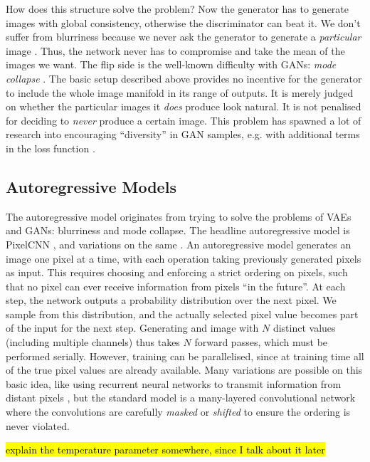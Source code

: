 \documentclass[10pt,a4paper]{article}
\newcommand{\nquote}[1]{``{#1}''}
\begin{document}
How does this structure solve the problem? Now the generator has to generate images with global consistency, otherwise the discriminator can beat it. We don't suffer from blurriness because we never ask the generator to generate a \emph{particular} image \cite{??}. Thus, the network never has to compromise and take the mean of the images we want. The flip side is the well-known difficulty with GANs: \emph{mode collapse} \cite{??}. The basic setup described above provides no incentive for the generator to include the whole image manifold in its range of outputs. It is merely judged on whether the particular images it \emph{does} produce look natural. It is not penalised for deciding to \emph{never} produce a certain image. This problem has spawned a lot of research into encouraging \nquote{diversity} in GAN samples, e.g. with additional terms in the loss function \cite{??}\cite{??}\cite{??}.

\subsection{Autoregressive Models}

The autoregressive model originates from trying to solve the problems of VAEs and GANs: blurriness and mode collapse. The headline autoregressive model is PixelCNN \cite{??}, and variations on the same \cite{??} \cite{??} \cite{??}. An autoregressive model generates an image one pixel at a time, with each operation taking previously generated pixels as input. This requires choosing and enforcing a strict ordering on pixels, such that no pixel can ever receive information from pixels \nquote{in the future}. At each step, the network outputs a probability distribution over the next pixel. We sample from this distribution, and the actually selected pixel value becomes part of the input for the next step. Generating and image with $N$ distinct values (including multiple channels) thus takes $N$ forward passes, which must be performed serially. However, training can be parallelised, since at training time all of the true pixel values are already available. Many variations are possible on this basic idea, like using recurrent neural networks to transmit information from distant pixels \cite{??}, but the standard model is a many-layered convolutional network where the convolutions are carefully \emph{masked} \cite{??} or \emph{shifted} \cite{??} to ensure the ordering is never violated.

\hl{explain the temperature parameter somewhere, since I talk about it later}
\end{document}
